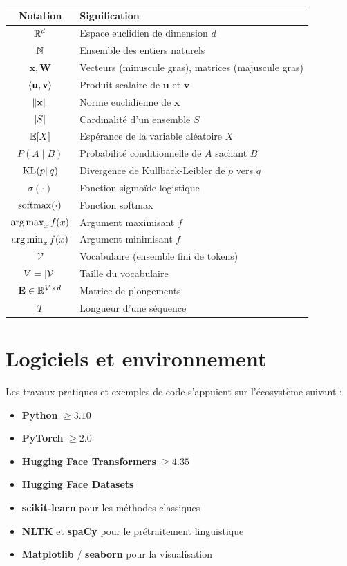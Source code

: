 \begin{center}
\renewcommand{\arraystretch}{1.3}
\begin{tabular}{cl}
\toprule
\textbf{Notation} & \textbf{Signification} \\
\midrule
$\mathbb{R}^d$ & Espace euclidien de dimension $d$ \\
$\mathbb{N}$ & Ensemble des entiers naturels \\
$\mathbf{x}, \mathbf{W}$ & Vecteurs (minuscule gras), matrices (majuscule gras) \\
$\langle \mathbf{u}, \mathbf{v} \rangle$ & Produit scalaire de $\mathbf{u}$ et $\mathbf{v}$ \\
$\left\| \mathbf{x} \right\|$ & Norme euclidienne de $\mathbf{x}$ \\
$\left| S \right|$ & Cardinalit\'e d'un ensemble $S$ \\
$\mathbb{E}[X]$ & Esp\'erance de la variable al\'eatoire $X$ \\
$P(A \mid B)$ & Probabilit\'e conditionnelle de $A$ sachant $B$ \\
$\mathrm{KL}(p \| q)$ & Divergence de Kullback-Leibler de $p$ vers $q$ \\
$\sigma(\cdot)$ & Fonction sigmo\"ide logistique \\
$\operatorname{softmax}(\cdot)$ & Fonction softmax \\
$\operatorname*{arg\,max}_x f(x)$ & Argument maximisant $f$ \\
$\operatorname*{arg\,min}_x f(x)$ & Argument minimisant $f$ \\
$\mathcal{V}$ & Vocabulaire (ensemble fini de tokens) \\
$V = \left| \mathcal{V} \right|$ & Taille du vocabulaire \\
$\mathbf{E} \in \mathbb{R}^{V \times d}$ & Matrice de plongements \\
$T$ & Longueur d'une s\'equence \\
\bottomrule
\end{tabular}
\end{center}

\section*{Logiciels et environnement}

Les travaux pratiques et exemples de code s'appuient sur l'\'ecosyst\`eme
suivant :

\begin{itemize}
    \item \textbf{Python} $\geq 3.10$
    \item \textbf{PyTorch} $\geq 2.0$
    \item \textbf{Hugging Face Transformers} $\geq 4.35$
    \item \textbf{Hugging Face Datasets}
    \item \textbf{scikit-learn} pour les m\'ethodes classiques
    \item \textbf{NLTK} et \textbf{spaCy} pour le pr\'etraitement linguistique
    \item \textbf{Matplotlib} / \textbf{seaborn} pour la visualisation
\end{itemize}

